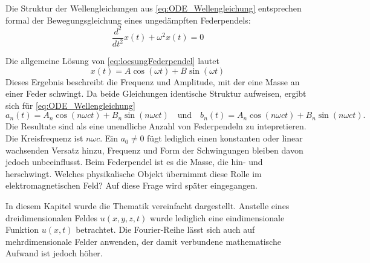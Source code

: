Die Struktur der Wellengleichungen aus \eqref{eq:ODE_Wellengleichung} entsprechen formal der Bewegungsgleichung eines ungedämpften Federpendels: 
\begin{equation}\label{eq:loesungFederpendel}
	\frac{d^2}{dt^2}x(t) + \omega^2 x(t) = 0
\end{equation}

Die allgemeine Lösung von \eqref{eq:loesungFederpendel} lautet  
\begin{equation}
	x(t) = A \cos(\omega t) + B \sin(\omega t)
\end{equation}
Dieses Ergebnis beschreibt die Frequenz und Amplitude, mit der eine Masse an einer Feder schwingt.  
Da beide Gleichungen identische Struktur aufweisen, ergibt sich für \eqref{eq:ODE_Wellengleichung} 
\begin{equation}
	a_n(t) = A_n \cos(n \omega c t) + B_n \sin(n \omega c t)
	\quad\text{und}\quad
	b_n(t) = A_n \cos(n \omega c t) + B_n \sin(n \omega c t).
\end{equation}
Die Resultate sind als eine unendliche Anzahl von Federpendeln zu intepretieren.
Die Kreisfrequenz ist $n \omega c$. 
Ein $a_0\neq0$ fügt lediglich einen konstanten oder linear wachsenden Versatz hinzu, Frequenz und Form der Schwingungen bleiben davon jedoch unbeeinflusst.
Beim Federpendel ist es die Masse, die hin- und herschwingt.
Welches physikalische Objekt übernimmt diese Rolle im elektromagnetischen Feld? 
Auf diese Frage wird später eingegangen.

In diesem Kapitel wurde die Thematik vereinfacht dargestellt. 
Anstelle eines dreidimensionalen Feldes $u(x,y,z,t)$ wurde lediglich eine eindimensionale Funktion $u(x,t)$ betrachtet. Die Fourier-Reihe lässt sich auch auf mehrdimensionale Felder anwenden, der damit verbundene mathematische Aufwand ist jedoch höher. 








